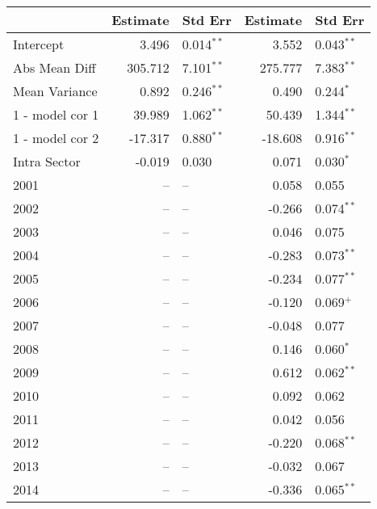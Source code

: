\documentclass[12pt]{article}
\begin{document}
\begin{table}
    \centering
    \begin{tabular}{l r l r l}
         & Estimate & Std Err & Estimate & Std Err \\
        \hline
        Intercept       &   3.496 &  0.014{$^{**}$} &   3.552 & 0.043{$^{**}$}  \\
        Abs Mean Diff   & 305.712 &  7.101{$^{**}$} & 275.777 & 7.383{$^{**}$}  \\
        Mean Variance   &   0.892 &  0.246{$^{**}$} &   0.490 & 0.244{$^{*}$}   \\
        1 - model cor 1 &  39.989 &  1.062{$^{**}$} &  50.439 & 1.344{$^{**}$}  \\
        1 - model cor 2 & -17.317 &  0.880{$^{**}$} & -18.608 & 0.916{$^{**}$}  \\
        Intra Sector    &  -0.019 &  0.030{$^{  }$} &   0.071 & 0.030{$^{*}$}   \\
        2001            &      -- &              -- &   0.058 & 0.055           \\
        2002            &      -- &              -- &  -0.266 & 0.074{$^{**}$}  \\
        2003            &      -- &              -- &   0.046 & 0.075           \\
        2004            &      -- &              -- &  -0.283 & 0.073{$^{**}$}  \\
        2005            &      -- &              -- &  -0.234 & 0.077{$^{**}$}  \\
        2006            &      -- &              -- &  -0.120 & 0.069{$^{+}$}   \\
        2007            &      -- &              -- &  -0.048 & 0.077           \\
        2008            &      -- &              -- &   0.146 & 0.060{$^{*}$}   \\
        2009            &      -- &              -- &   0.612 & 0.062{$^{**}$}  \\
        2010            &      -- &              -- &   0.092 & 0.062           \\
        2011            &      -- &              -- &   0.042 & 0.056           \\
        2012            &      -- &              -- &  -0.220 & 0.068{$^{**}$}  \\
        2013            &      -- &              -- &  -0.032 & 0.067           \\
        2014            &      -- &              -- &  -0.336 & 0.065{$^{**}$}  \\

\end{tabular}
\end{table}
\end{document}
